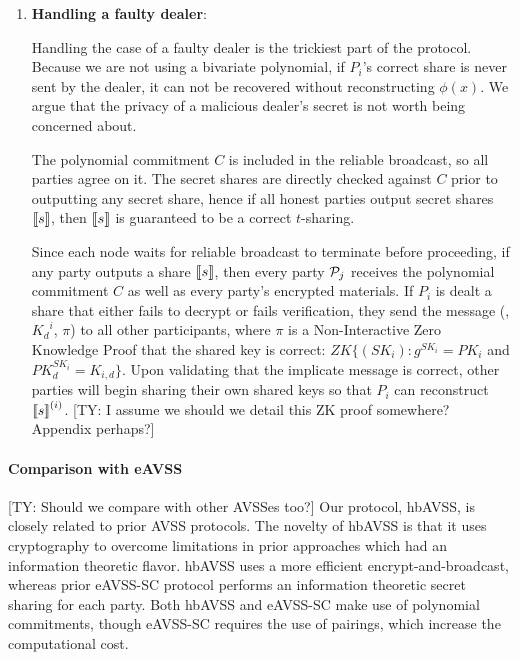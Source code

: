 \documentclass{sig-alternate-05-2015}
\newcommand{\tnote}[1]{{\color{green}[TY: #1]}}
\begin{document}
\begin{enumerate}
\begin{enumerate}
\item \textbf{Handling a faulty dealer}:

   Handling the case of a faulty dealer is the trickiest part of the protocol. Because we are not using a bivariate polynomial, if $P_i$'s correct share is never sent by the dealer, it can not be recovered without reconstructing $\phi(x)$. We argue that the privacy of a malicious dealer's secret is not worth being concerned about.

The polynomial commitment $C$ is included in the reliable broadcast, so all parties agree on it. The secret shares are directly checked against $C$ prior to outputting any secret share, hence if all honest parties output secret shares $\share{s}$, then $\share{s}$ is guaranteed to be a correct $t$-sharing.

  Since each node waits for reliable broadcast to terminate before proceeding, if any party outputs a share $\share{s}$, then every party $\P_j$ receives the polynomial commitment $C$ as well as every party's encrypted materials. If $P_i$ is dealt a share that either fails to decrypt or fails verification, they send the message (, ${K_d}^i$, $\pi$) to all other participants, where $\pi$ is a Non-Interactive Zero Knowledge Proof that the shared key is correct: $ZK\{(SK_i):g^{SK_i} = PK_i$ and $PK_d^{SK_i} = K_{i,d}\}$. Upon validating that the implicate message is correct, other parties will begin sharing their own shared keys so that $P_i$ can reconstruct $\share{s}^{(i)}$. \tnote{I assume we should we detail this ZK proof somewhere? Appendix perhaps?}
  
  \end{enumerate}
\end{enumerate}

\paragraph{Comparison with eAVSS~\cite{eavss}}
\tnote{Should we compare with other AVSSes too?}
Our protocol, hbAVSS, is closely related to prior AVSS protocols. 
The novelty of hbAVSS is that it uses cryptography to overcome limitations in prior approaches which had an information theoretic flavor. hbAVSS uses a more efficient encrypt-and-broadcast, whereas  prior eAVSS-SC protocol performs an information theoretic secret sharing for each party. Both hbAVSS and eAVSS-SC make use of polynomial commitments, though eAVSS-SC requires the use of pairings, which increase the computational cost.
\end{document}
